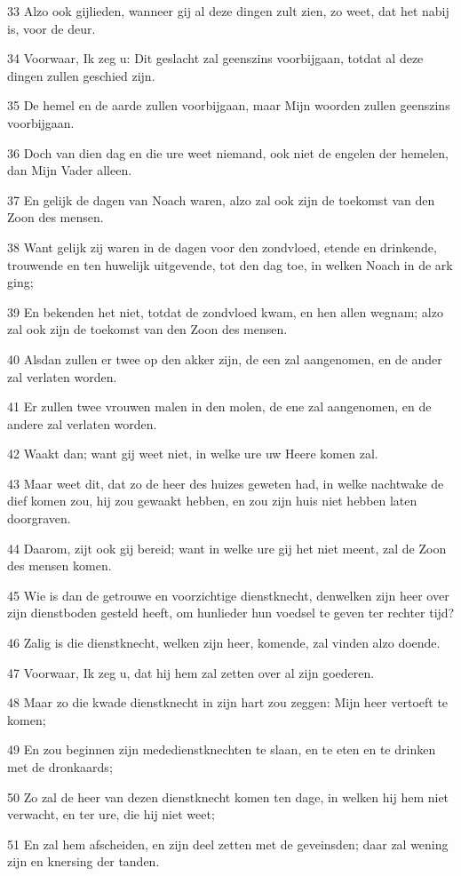 \par 33 Alzo ook gijlieden, wanneer gij al deze dingen zult zien, zo weet, dat het nabij is, voor de deur.
\par 34 Voorwaar, Ik zeg u: Dit geslacht zal geenszins voorbijgaan, totdat al deze dingen zullen geschied zijn.
\par 35 De hemel en de aarde zullen voorbijgaan, maar Mijn woorden zullen geenszins voorbijgaan.
\par 36 Doch van dien dag en die ure weet niemand, ook niet de engelen der hemelen, dan Mijn Vader alleen.
\par 37 En gelijk de dagen van Noach waren, alzo zal ook zijn de toekomst van den Zoon des mensen.
\par 38 Want gelijk zij waren in de dagen voor den zondvloed, etende en drinkende, trouwende en ten huwelijk uitgevende, tot den dag toe, in welken Noach in de ark ging;
\par 39 En bekenden het niet, totdat de zondvloed kwam, en hen allen wegnam; alzo zal ook zijn de toekomst van den Zoon des mensen.
\par 40 Alsdan zullen er twee op den akker zijn, de een zal aangenomen, en de ander zal verlaten worden.
\par 41 Er zullen twee vrouwen malen in den molen, de ene zal aangenomen, en de andere zal verlaten worden.
\par 42 Waakt dan; want gij weet niet, in welke ure uw Heere komen zal.
\par 43 Maar weet dit, dat zo de heer des huizes geweten had, in welke nachtwake de dief komen zou, hij zou gewaakt hebben, en zou zijn huis niet hebben laten doorgraven.
\par 44 Daarom, zijt ook gij bereid; want in welke ure gij het niet meent, zal de Zoon des mensen komen.
\par 45 Wie is dan de getrouwe en voorzichtige dienstknecht, denwelken zijn heer over zijn dienstboden gesteld heeft, om hunlieder hun voedsel te geven ter rechter tijd?
\par 46 Zalig is die dienstknecht, welken zijn heer, komende, zal vinden alzo doende.
\par 47 Voorwaar, Ik zeg u, dat hij hem zal zetten over al zijn goederen.
\par 48 Maar zo die kwade dienstknecht in zijn hart zou zeggen: Mijn heer vertoeft te komen;
\par 49 En zou beginnen zijn mededienstknechten te slaan, en te eten en te drinken met de dronkaards;
\par 50 Zo zal de heer van dezen dienstknecht komen ten dage, in welken hij hem niet verwacht, en ter ure, die hij niet weet;
\par 51 En zal hem afscheiden, en zijn deel zetten met de geveinsden; daar zal wening zijn en knersing der tanden.

